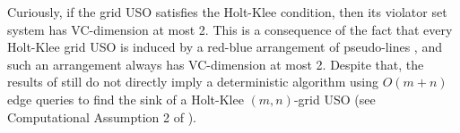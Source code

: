 \documentclass[runningheads,a4paper]{llncs}
\begin{document}
Curiously, if the grid USO satisfies the Holt-Klee condition, then its violator set system has VC-dimension at most 2.
This is a consequence of the fact that every Holt-Klee grid USO is induced by a red-blue arrangement of pseudo-lines \cite{grid05,falkthesis}, and such an arrangement always has VC-dimension at most 2.
Despite that, the results of \citet{ChazelleM96} still do not directly imply a deterministic algorithm using $O(m+n)$ edge queries to find the sink of a Holt-Klee $(m,n)$-grid USO (see Computational Assumption 2 of \cite{ChazelleM96}). 

\end{document}
